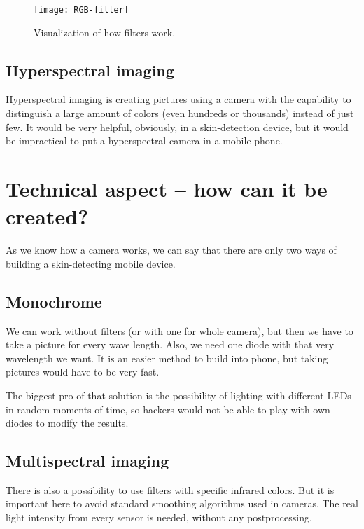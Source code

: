             \begin{figure}[H]
                \caption{Visualization of how filters work.}
                \centering
                \texttt{[image: RGB-filter]}
                \label{fig:RGB-filter}
            \end{figure}

        \subsection*{Hyperspectral imaging}
            Hyperspectral imaging is creating pictures using a camera with the
            capability to distinguish a large amount of colors
            (even hundreds or thousands) instead of just few.
            It would be very helpful, obviously, in a skin-detection device,
            but it would be impractical to put a hyperspectral camera in a mobile phone.

    \section{Technical aspect -- how can it be created?}
        As we know how a camera works, we can say that there are only two ways of
        building a skin-detecting mobile device.
        \subsection*{Monochrome}
            We can work without filters (or with one for whole camera),
            but then we have to take a picture for every wave length.
            Also, we need one diode with that very wavelength we want.
            It is an easier method to build into phone, but taking pictures
            would have to be very fast.

            The biggest pro of that solution is the possibility of lighting
            with different LEDs in random moments of time, so hackers
            would not be able to play with own diodes to modify the results.

        \subsection*{Multispectral imaging}
            There is also a possibility to use filters with specific infrared colors.
            But it is important here to avoid standard smoothing algorithms used
            in cameras.
            The real light intensity from every sensor is needed,
            without any postprocessing.

